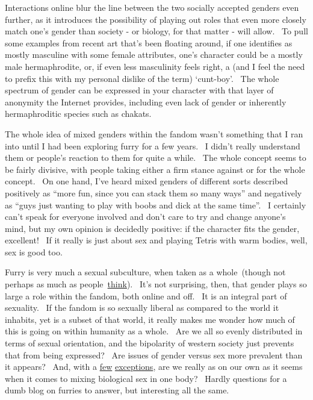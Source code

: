 Interactions online blur the line between the two socially accepted
genders even further, as it introduces the possibility of playing out
roles that even more closely match one's gender than society - or
biology, for that matter - will allow. ~To pull some examples from
recent art that's been floating around, if one identifies as mostly
masculine with some female attributes, one's character could be a mostly
male hermaphrodite, or, if even less masculinity feels right, a (and I
feel the need to prefix this with my personal dislike of the term)
`cunt-boy'. ~The whole spectrum of gender can be expressed in your
character with that layer of anonymity the Internet provides, including
even lack of gender or inherently hermaphroditic species such as
chakats.

The whole idea of mixed genders within the fandom wasn't something that
I ran into until I had been exploring furry for a few years. ~I didn't
really understand them or people's reaction to them for quite a while.
~The whole concept seems to be fairly divisive, with people taking
either a firm stance against or for the whole concept. ~On one hand,
I've heard mixed genders of different sorts described positively as
``more fun, since you can stack them so many ways'' and negatively as
``guys just wanting to play with boobs and dick at the same time''. ~I
certainly can't speak for everyone involved and don't care to try and
change anyone's mind, but my own opinion is decidedly positive: if the
character fits the gender, excellent! ~If it really is just about sex
and playing Tetris with warm bodies, well, sex is good too.

Furry is very much a sexual subculture, when taken as a whole~(though
not perhaps as much as
people~\href{http://vis.adjectivespeces.com/furrysurvey/sexImportance.shtml}{think}).
~It's not surprising, then, that gender plays so large a role within the
fandom, both online and off. ~It is an integral part of sexuality. ~If
the fandom is so sexually liberal as compared to the world it inhabits,
yet is a subset of that world, it really makes me wonder how much of
this is going on within humanity as a whole. ~Are we all so evenly
distributed in terms of sexual orientation, and the bipolarity of
western society just prevents that from being expressed? ~Are issues of
gender versus sex more prevalent than it appears? ~And, with a
\href{http://en.wikipedia.org/wiki/Two-spirited}{few}
\href{http://en.wikipedia.org/wiki/Third_gender}{exceptions}, are we
really as on our own as it seems when it comes to mixing biological sex
in one body? ~Hardly questions for a dumb blog on furries to answer, but
interesting all the same.
